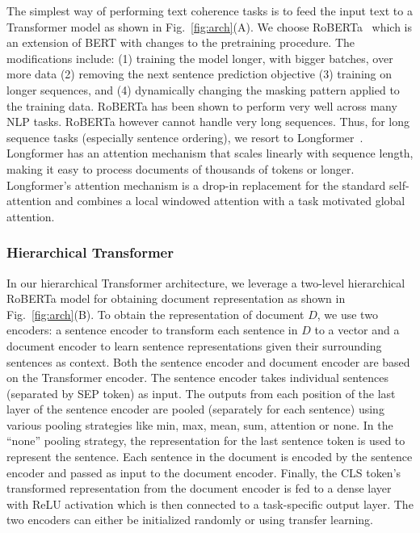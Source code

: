 \documentclass[11pt]{article}
\begin{document}
The simplest way of performing text coherence tasks is to feed the input text to a Transformer model as shown in Fig.~\ref{fig:arch}(A). We choose RoBERTa~\cite{liu2019roberta} which is an extension of BERT with changes to the pretraining procedure. The modifications include: (1) training the model longer, with bigger batches, over more data (2) removing the next sentence prediction objective (3) training on longer sequences, and (4) dynamically changing the masking pattern applied to the training data. RoBERTa has been shown to perform very well across many NLP tasks. RoBERTa however cannot handle very long sequences. Thus, for long sequence tasks (especially sentence ordering), we resort to Longformer~\cite{beltagy2020longformer}. Longformer has an attention mechanism that scales linearly with sequence length, making it easy to process documents of thousands of tokens or longer. Longformer's attention mechanism is a drop-in replacement for the standard self-attention and combines a local windowed attention with a task motivated global attention. 

\subsubsection{Hierarchical Transformer}
In our hierarchical Transformer architecture, we leverage a two-level hierarchical RoBERTa model for obtaining document representation as shown in Fig.~\ref{fig:arch}(B). To obtain the representation of document $D$, we use two encoders: a sentence encoder to transform each sentence in $D$ to a vector and a document encoder to learn sentence representations given their surrounding sentences as context. Both the sentence encoder and document encoder are based on the Transformer encoder. The sentence encoder takes individual sentences (separated by SEP token) as input. The outputs from each position of the last layer of the sentence encoder are pooled (separately for each sentence) using various pooling strategies like min, max, mean, sum, attention or none. In the ``none'' pooling strategy, the representation for the last sentence token is used to represent the sentence. Each sentence in the document is encoded by the sentence encoder and passed as input to the document encoder. Finally, the CLS token's transformed representation from the document encoder is fed to a dense layer with ReLU activation which is then connected to a task-specific output layer. The two encoders can either be initialized randomly or using transfer learning. 
\end{document}
